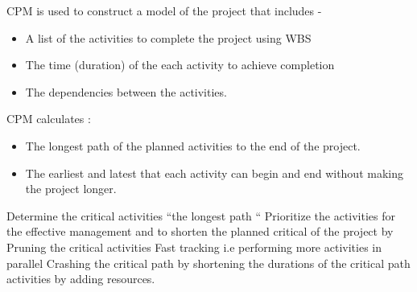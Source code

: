 CPM is used to construct a model of the project that includes -
\begin{itemize}
	\item A list of the activities to complete the project using WBS
		\item The time (duration) of the each activity to achieve completion 
			\item The dependencies between the activities.
\end{itemize}




CPM calculates :
\begin{itemize}
	\item The longest path of the planned activities to the end of the project.
	\item The earliest and latest that each activity can begin and end without making the project longer.
\end{itemize}


Determine the critical activities “the longest path “
Prioritize the activities for the effective management and to shorten the planned critical of the project by 
Pruning the critical activities 
Fast tracking i.e performing more activities in parallel 
Crashing the critical path by shortening the durations of the critical path activities by adding resources. 